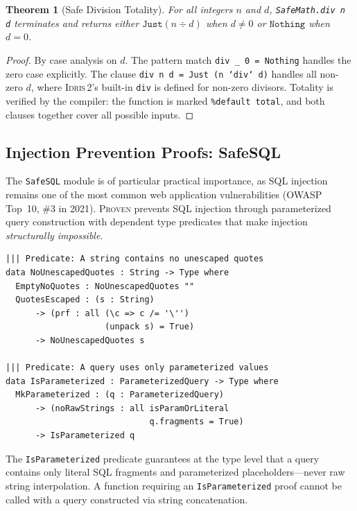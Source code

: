 \documentclass[11pt,a4paper]{article}
\newtheorem{theorem}{Theorem}[section]
\newcommand{\proven}{\textsc{Proven}}
\newcommand{\idris}{\textsc{Idris\,2}}
\newcommand{\safe}[1]{\texttt{Safe#1}}
\newcommand{\code}[1]{\texttt{#1}}
\begin{document}
\begin{theorem}[Safe Division Totality]
\label{thm:safe-div}
For all integers $n$ and $d$, \code{SafeMath.div n d} terminates and
returns either $\code{Just}(n \div d)$ when $d \neq 0$ or $\code{Nothing}$
when $d = 0$.
\end{theorem}

\begin{proof}
By case analysis on $d$. The pattern match \code{div \_ 0 = Nothing}
handles the zero case explicitly. The clause \code{div n d = Just (n `div`
d)} handles all non-zero $d$, where \idris{}'s built-in \code{div} is
defined for non-zero divisors. Totality is verified by the compiler: the
function is marked \code{\%default total}, and both clauses together cover
all possible inputs.
\end{proof}

\subsection{Injection Prevention Proofs: SafeSQL}
\label{sec:proof-sql}

The \safe{SQL} module is of particular practical importance, as SQL
injection remains one of the most common web application vulnerabilities
(OWASP Top~10, \#3 in 2021). \proven{} prevents SQL injection
through parameterized query construction with dependent type predicates
that make injection \emph{structurally impossible}.

\begin{lstlisting}[language=Idris2, caption={Safety predicates from
\code{Proven.SafeSQL.Proofs}. Each predicate is a type whose inhabitants
serve as compile-time proof that a string property holds.},
label=lst:sql-predicates]
||| Predicate: A string contains no unescaped quotes
data NoUnescapedQuotes : String -> Type where
  EmptyNoQuotes : NoUnescapedQuotes ""
  QuotesEscaped : (s : String)
      -> (prf : all (\c => c /= '\'')
                    (unpack s) = True)
      -> NoUnescapedQuotes s

||| Predicate: A query uses only parameterized values
data IsParameterized : ParameterizedQuery -> Type where
  MkParameterized : (q : ParameterizedQuery)
      -> (noRawStrings : all isParamOrLiteral
                             q.fragments = True)
      -> IsParameterized q
\end{lstlisting}

The \code{IsParameterized} predicate guarantees at the type level that a
query contains only literal SQL fragments and parameterized placeholders---never
raw string interpolation. A function requiring an \code{IsParameterized}
proof cannot be called with a query constructed via string concatenation.
\end{document}
